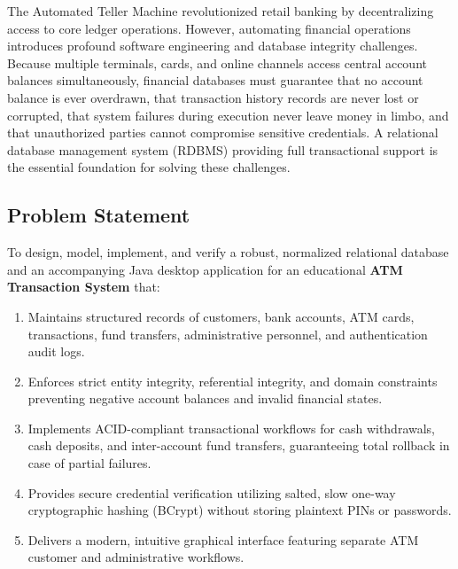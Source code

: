 \documentclass[11pt,a4paper]{report}
\begin{document}
The Automated Teller Machine revolutionized retail banking by decentralizing access to core ledger operations. However, automating financial operations introduces profound software engineering and database integrity challenges. Because multiple terminals, cards, and online channels access central account balances simultaneously, financial databases must guarantee that no account balance is ever overdrawn, that transaction history records are never lost or corrupted, that system failures during execution never leave money in limbo, and that unauthorized parties cannot compromise sensitive credentials. A relational database management system (RDBMS) providing full transactional support is the essential foundation for solving these challenges.

\subsection{Problem Statement}
To design, model, implement, and verify a robust, normalized relational database and an accompanying Java desktop application for an educational \textbf{ATM Transaction System} that:
\begin{enumerate}
    \item Maintains structured records of customers, bank accounts, ATM cards, transactions, fund transfers, administrative personnel, and authentication audit logs.
    \item Enforces strict entity integrity, referential integrity, and domain constraints preventing negative account balances and invalid financial states.
    \item Implements ACID-compliant transactional workflows for cash withdrawals, cash deposits, and inter-account fund transfers, guaranteeing total rollback in case of partial failures.
    \item Provides secure credential verification utilizing salted, slow one-way cryptographic hashing (BCrypt) without storing plaintext PINs or passwords.
    \item Delivers a modern, intuitive graphical interface featuring separate ATM customer and administrative workflows.
\end{enumerate}
\end{document}

